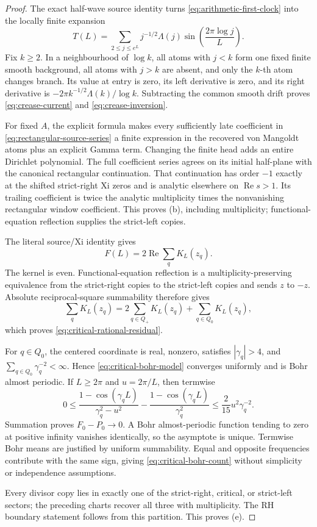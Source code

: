 \documentclass[11pt]{article}
\theoremstyle{definition}
\theoremstyle{remark}
\newcommand{\Rea}{\operatorname{Re}}
\begin{document}
\begin{proof}
The exact half-wave source identity turns \eqref{eq:arithmetic-first-clock} into the locally
finite expansion
\[
 T(L)=\sum_{2\le j\le e^L}j^{-1/2}\Lambda(j)
       \sin\!\left(\frac{2\pi\log j}{L}\right).
 \tag{3.14}\label{eq:local-prime-packet}
\]
Fix $k\ge2$.  In a neighbourhood of $\log k$, all atoms with $j<k$ form one fixed finite smooth
background, all atoms with $j>k$ are absent, and only the $k$-th atom changes branch.  Its value
at entry is zero, its left derivative is zero, and its right derivative is
$-2\pi k^{-1/2}\Lambda(k)/\log k$.  Subtracting the common smooth drift proves
\eqref{eq:crease-current} and \eqref{eq:crease-inversion}.

For fixed $A$, the explicit formula makes every sufficiently late coefficient in
\eqref{eq:rectangular-source-series} a finite expression in the recovered von Mangoldt atoms plus
an explicit Gamma term.  Changing the finite head adds an entire Dirichlet polynomial.  The full
coefficient series agrees on its initial half-plane with the canonical rectangular continuation.
That continuation has order $-1$ exactly at the
shifted strict-right Xi zeros and is analytic elsewhere on $\Rea s>1$.  Its trailing coefficient
is twice the analytic multiplicity times the nonvanishing rectangular window coefficient.
This proves (b), including multiplicity; functional-equation reflection supplies the strict-left
copies.

The literal source/Xi identity gives
\[
 F(L)=2\Rea\sum_q K_L(z_q).
 \tag{3.15}\label{eq:full-clock-divisor}
\]
The kernel is even.  Functional-equation reflection is a multiplicity-preserving equivalence
from the strict-right copies to the strict-left copies and sends $z$ to $-z$.  Absolute
reciprocal-square summability therefore gives
\[
 \sum_qK_L(z_q)=2\sum_{q\in Q_+}K_L(z_q)+\sum_{q\in Q_0}K_L(z_q),
\]
which proves \eqref{eq:critical-rational-residual}.

For $q\in Q_0$, the centered coordinate is real, nonzero, satisfies $|\gamma_q|>4$, and
$\sum_{q\in Q_0}\gamma_q^{-2}<\infty$.  Hence \eqref{eq:critical-bohr-model} converges uniformly
and is Bohr almost periodic.  If $L\ge2\pi$ and $u=2\pi/L$, then termwise
\[
 0\le
 \frac{1-\cos(\gamma_qL)}{\gamma_q^2-u^2}
 -\frac{1-\cos(\gamma_qL)}{\gamma_q^2}
 \le \frac{2}{15}u^2\gamma_q^{-2}.
\]
Summation proves $F_0-P_0\to0$.  A Bohr almost-periodic function tending to zero at positive
infinity vanishes identically, so the asymptote is unique.  Termwise Bohr means are justified by
uniform summability.  Equal and opposite frequencies contribute with the same sign, giving
\eqref{eq:critical-bohr-count} without simplicity or independence assumptions.

Every divisor copy lies in exactly one of the strict-right, critical, or strict-left sectors;
the preceding charts recover all three with multiplicity.  The RH boundary statement follows
from this partition.  This proves (e).
\end{proof}
\end{document}
